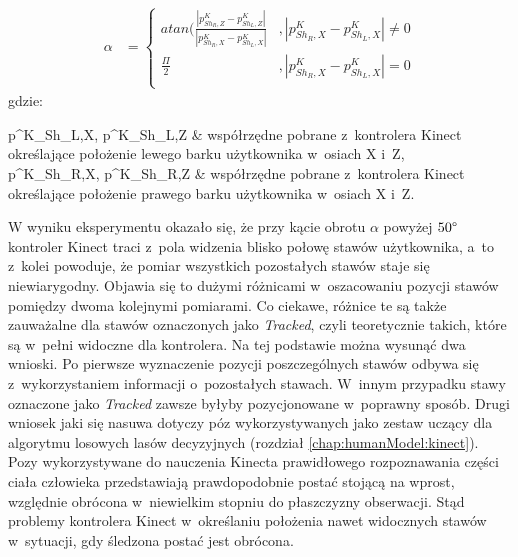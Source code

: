 \begin{equation}
	\label{eq:characteristics:kinect:bodyRotationAngle}
	\begin{split}
		\alpha &= 
		\begin{cases} 
			atan(\frac{|p^K_{{Sh}_R,Z} - p^K_{{Sh}_L,Z}|}{|p^K_{{Sh}_R,X} - p^K_{{Sh}_L,X}|} & , |p^K_{{Sh}_R,X} - p^K_{{Sh}_L,X}| \neq 0 \\
			\frac{\Pi}{2}                                                                    & , |p^K_{{Sh}_R,X} - p^K_{{Sh}_L,X}| = 0    \\		
		\end{cases}
	\end{split}
\end{equation}
gdzie:
\begin{conditions}
	p^K_{{Sh}_L,X}, p^K_{{Sh}_L,Z}			& współrzędne pobrane z~kontrolera Kinect określające położenie lewego barku użytkownika w~osiach X i~Z,\\
	p^K_{{Sh}_R,X}, p^K_{{Sh}_R,Z}			& współrzędne pobrane z~kontrolera Kinect określające położenie prawego barku użytkownika w~osiach X i~Z.\\
\end{conditions}
																																					
																																					
W wyniku eksperymentu okazało się, że przy kącie obrotu $\alpha$ powyżej $50\degree$ kontroler Kinect traci z~pola widzenia blisko połowę stawów użytkownika, a~to z~kolei powoduje, że pomiar wszystkich pozostałych stawów staje się niewiarygodny. Objawia się to dużymi różnicami w~oszacowaniu pozycji stawów pomiędzy dwoma kolejnymi pomiarami. Co ciekawe, różnice te są także zauważalne dla stawów oznaczonych jako \emph{Tracked}, czyli teoretycznie takich, które są w~pełni widoczne dla kontrolera. Na tej podstawie można wysunąć dwa wnioski. Po pierwsze wyznaczenie pozycji poszczególnych stawów odbywa się z~wykorzystaniem informacji o~pozostałych stawach. W~innym przypadku stawy oznaczone jako \emph{Tracked} zawsze byłyby pozycjonowane w~poprawny sposób. Drugi wniosek jaki się nasuwa dotyczy póz wykorzystywanych jako zestaw uczący dla algorytmu losowych lasów decyzyjnych (rozdział \ref{chap:humanModel:kinect}). Pozy wykorzystywane do nauczenia Kinecta prawidłowego rozpoznawania części ciała człowieka przedstawiają prawdopodobnie postać stojącą na wprost, względnie obrócona w~niewielkim stopniu do płaszczyzny obserwacji. Stąd problemy kontrolera Kinect w~określaniu położenia nawet widocznych stawów w~sytuacji, gdy śledzona postać jest obrócona.
																																					
